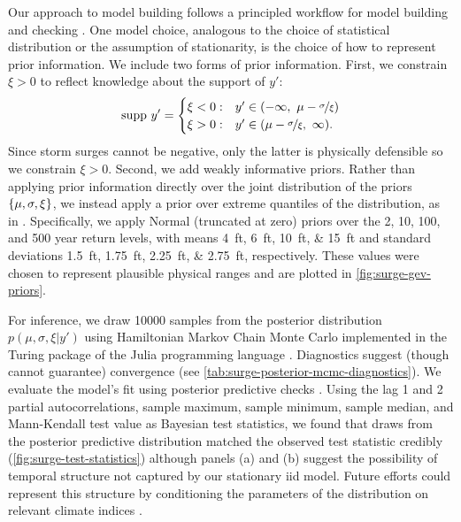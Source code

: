 \documentclass[11pt]{article}
\begin{document}
Our approach to model building follows a principled workflow for model building and checking \citep[see][for details]{gelman_workflow:2020}.
One model choice, analogous to the choice of statistical distribution or the assumption of stationarity, is the choice of how to represent prior information.
We include two forms of prior information.
First, we constrain $\xi > 0$ to reflect knowledge about the support of $y'$:
\begin{equation*}
    \mathrm{supp}~ y' =
    \begin{cases}
        \xi < 0: & y' \in \qty(-\infty,~ \mu - \nicefrac{\sigma}{\xi}) \\
        \xi > 0: & y' \in \qty(\mu-\nicefrac{\sigma}{\xi},~ \infty).
    \end{cases}
\end{equation*}
Since storm surges cannot be negative, only the latter is physically defensible so we constrain $\xi > 0$.
Second, we add weakly informative priors.
Rather than applying prior information directly over the joint distribution of the priors $\qty{\mu,\sigma,\xi}$, we instead apply a prior over extreme quantiles of the distribution, as in \citet{coles_evd:1996}.
Specifically, we apply Normal (truncated at zero) priors over the 2, 10, 100, and 500 year return levels, with means \SIlist{4;6;10;15}{ft} and standard deviations \SIlist{1.5;1.75;2.25;2.75}{ft}, respectively.
These values were chosen to represent plausible physical ranges and are plotted in \cref{fig:surge-gev-priors}.

For inference, we draw \num{10000} samples from the posterior distribution $p(\mu,\sigma,\xi | y')$ using Hamiltonian Markov Chain Monte Carlo \citep{Betancourt:2017vd,hoffman_nuts:2011} implemented in the Turing package of the Julia programming language \citep{perkel_julia:2019,ge_turing:2018,tarek_dynamicppl:2020,besancon_distributions.jl:2021,bezanson_julia:2012}.
Diagnostics suggest (though cannot guarantee) convergence (see \cref{tab:surge-posterior-mcmc-diagnostics}).
We evaluate the model's fit using posterior predictive checks \citep[see][section 2.4 and references therein]{gelman_workflow:2020}.
Using the lag 1 and 2 partial autocorrelations, sample maximum, sample minimum, sample median, and Mann-Kendall test value as Bayesian test statistics, we found that draws from the posterior predictive distribution matched the observed test statistic credibly (\cref{fig:surge-test-statistics}) although panels (a) and (b) suggest the possibility of temporal structure not captured by our stationary \gls{iid} model.
Future efforts could represent this structure by conditioning the parameters of the distribution on relevant climate indices \citep[as in][]{wong_structural:2020,Farnham:2016tw,farnham_jetstream:2017}.
\end{document}
